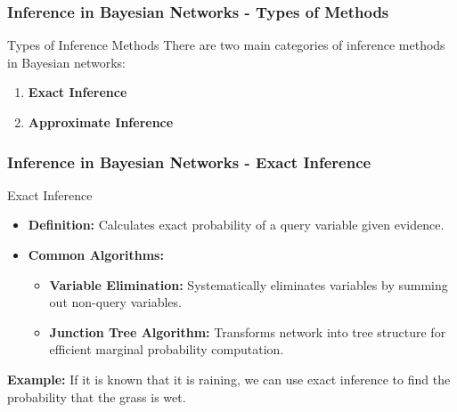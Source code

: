\documentclass[aspectratio=169]{beamer}
\begin{document}
\begin{frame}[fragile]
    \frametitle{Inference in Bayesian Networks - Types of Methods}
    \begin{block}{Types of Inference Methods}
        There are two main categories of inference methods in Bayesian networks:
    \end{block}
    \begin{enumerate}
        \item \textbf{Exact Inference}
        \item \textbf{Approximate Inference}
    \end{enumerate}
\end{frame}

\begin{frame}[fragile]
    \frametitle{Inference in Bayesian Networks - Exact Inference}
    \begin{block}{Exact Inference}
        \begin{itemize}
            \item \textbf{Definition:} Calculates exact probability of a query variable given evidence.
            \item \textbf{Common Algorithms:}
                \begin{itemize}
                    \item \textbf{Variable Elimination:} Systematically eliminates variables by summing out non-query variables.
                    \item \textbf{Junction Tree Algorithm:} Transforms network into tree structure for efficient marginal probability computation.
                \end{itemize}
        \end{itemize}
        \textbf{Example:} If it is known that it is raining, we can use exact inference to find the probability that the grass is wet.
    \end{block}
\end{frame}
\end{document}

